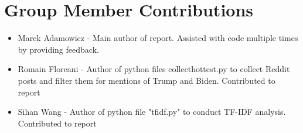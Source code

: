 \documentclass[11pt]{article}
\begin{document}
\section{Group Member Contributions}

\begin{itemize}
    \item Marek Adamowicz - Main author of report. Assisted with code multiple times by providing feedback.
    \item Romain Floreani - Author of python files collecthottest.py to collect Reddit posts and filter them for mentions of Trump and Biden. Contributed to report
    \item Sihan Wang - Author of python file "tfidf.py" to conduct TF-IDF analysis. Contributed to report
\end{itemize}
\end{document}
